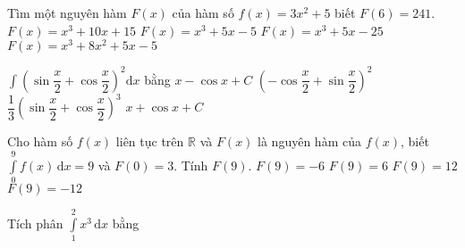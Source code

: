 \begin{ex}%
	Tìm một nguyên hàm $F(x)$ của hàm số $ f(x)=3 x^{2} + 5$ biết $F(6) =241$.
	\choice
	{ $ F(x)=x^{3} + 10 x + 15$ }
	{ \True $ F(x)=x^{3} + 5 x - 5$ }
	{ $ F(x)=x^{3} + 5 x - 25$ }
	{ $ F(x)=x^{3} + 8 x^{2} + 5 x - 5$ }
\end{ex}

\begin{ex}%
	$\displaystyle \int \left(\sin \dfrac{x}{2}+\cos\dfrac{x}{2} \right)^2 \mathrm{d}x$ bằng
	\choice
	{\True $x-\cos x+C$}
	{$\left(-\cos \dfrac{x}{2}+\sin\dfrac{x}{2} \right)^2$}
	{$\dfrac{1}{3} \left(\sin \dfrac{x}{2}+\cos\dfrac{x}{2}\right)^3$}
	{$x+\cos x+C$}
\end{ex}

\begin{ex}%
	Cho hàm số $f(x)$ liên tục trên $\mathbb{R}$ và $F(x)$ là nguyên hàm của $f(x)$, biết $\displaystyle \int\limits_{0}^{9} f(x)\mathrm{\,d}x=9$ và $F(0)=3$. Tính $F(9)$.
	\choice
	{$F(9)=-6$}
	{$F(9)=6$}
	{\True $F(9)=12$}
	{$F(9)=-12$}
\end{ex}

\begin{ex}%
	Tích phân $\displaystyle\int\limits_{1}^{2} x^3\mathrm{\,d}x$ bằng
\end{ex}

